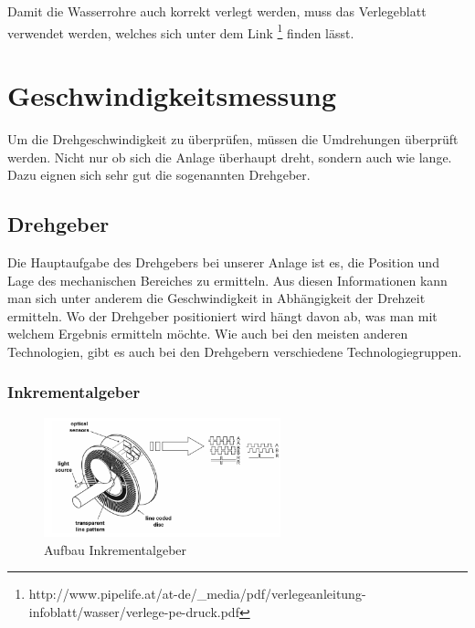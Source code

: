 Damit die Wasserrohre auch korrekt verlegt werden, muss das Verlegeblatt verwendet werden, welches sich unter dem Link \footnote{http://www.pipelife.at/at-de/_media/pdf/verlegeanleitung-infoblatt/wasser/verlege-pe-druck.pdf} finden lässt.

\newpage
\section{Geschwindigkeitsmessung}
\label{sec:geschwindigkeitsmessung}

Um die Drehgeschwindigkeit zu überprüfen, müssen die Umdrehungen überprüft werden. Nicht nur ob sich die Anlage überhaupt dreht, sondern auch wie lange. Dazu eignen sich sehr gut die sogenannten Drehgeber.

\subsection{Drehgeber}
\label{sec:drehgeber}

Die Hauptaufgabe des Drehgebers bei unserer Anlage ist es, die Position und Lage des mechanischen Bereiches zu ermitteln. Aus diesen Informationen kann man sich unter anderem die Geschwindigkeit in Abhängigkeit der Drehzeit ermitteln. Wo der Drehgeber positioniert wird hängt davon ab, was man mit welchem Ergebnis ermitteln möchte. Wie auch bei den meisten anderen Technologien, gibt es auch bei den Drehgebern verschiedene Technologiegruppen.

\subsubsection{Inkrementalgeber}
\label{sec:inkrementalgeber}

\begin{figure}[H]
\begin{center}
	\includegraphics[width=0.61\textwidth]{fig/Inkrementalgeber}
	\caption{Aufbau Inkrementalgeber \label{fig:inkrementalgeber}}
\end{center}
\end{figure}

